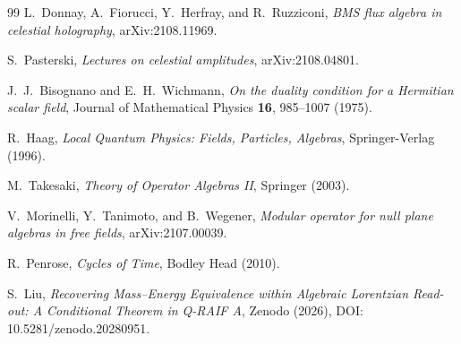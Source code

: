\documentclass[12pt,a4paper]{article}
\theoremstyle{definition}
\theoremstyle{remark}
\begin{document}
\begin{thebibliography}{99}
L.~Donnay, A.~Fiorucci, Y.~Herfray, and R.~Ruzziconi, \emph{BMS flux algebra in celestial holography}, arXiv:2108.11969.

S.~Pasterski, \emph{Lectures on celestial amplitudes}, arXiv:2108.04801.

J.~J.~Bisognano and E.~H.~Wichmann, \emph{On the duality condition for a Hermitian scalar field}, Journal of Mathematical Physics \textbf{16}, 985--1007 (1975).

R.~Haag, \emph{Local Quantum Physics: Fields, Particles, Algebras}, Springer-Verlag (1996).

M.~Takesaki, \emph{Theory of Operator Algebras II}, Springer (2003).

V.~Morinelli, Y.~Tanimoto, and B.~Wegener, \emph{Modular operator for null plane algebras in free fields}, arXiv:2107.00039.

R.~Penrose, \emph{Cycles of Time}, Bodley Head (2010).

S.~Liu, \emph{Recovering Mass--Energy Equivalence within Algebraic Lorentzian Read-out: A Conditional Theorem in Q-RAIF A}, Zenodo (2026), DOI: 10.5281/zenodo.20280951.

\end{thebibliography}
\end{document}
